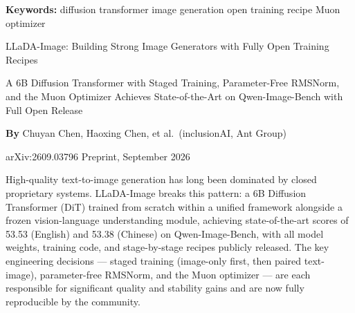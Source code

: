 \documentclass[10pt,twocolumn]{article}
\begin{document}
\setlength{\parindent}{0pt}
\setlength{\parskip}{4pt}

{\small\color{keywordgray}\textbf{Keywords:}
  diffusion transformer \textbullet{}
  image generation \textbullet{}
  open training recipe \textbullet{}
  Muon optimizer}\par\vspace{4pt}

{\LARGE\bfseries\raggedright
  LLaDA-Image: Building Strong Image Generators
  with Fully Open Training Recipes}\par\vspace{4pt}

{\large\itshape\raggedright
  A 6B Diffusion Transformer with Staged Training,
  Parameter-Free RMSNorm, and the Muon Optimizer
  Achieves State-of-the-Art on Qwen-Image-Bench
  with Full Open Release}\par\vspace{6pt}

{\small\textbf{By} Chuyan Chen, Haoxing Chen, et al.\
  (inclusionAI, Ant Group)}\par\vspace{2pt}

{\small\color{keywordgray}arXiv:2609.03796 \textbullet{} Preprint, September 2026}
\par\vspace{2pt}\noindent{\color{rulered}\rule{\columnwidth}{0.6pt}}\vspace{6pt}

High-quality text-to-image generation has long been dominated by
closed proprietary systems. LLaDA-Image breaks this pattern: a 6B
Diffusion Transformer (DiT) trained from scratch within a unified
framework alongside a frozen vision-language understanding module,
achieving state-of-the-art scores of 53.53 (English) and 53.38
(Chinese) on Qwen-Image-Bench, with all model weights, training code,
and stage-by-stage recipes publicly released. The key engineering
decisions --- staged training (image-only first, then paired text-image),
parameter-free RMSNorm, and the Muon optimizer --- are each responsible
for significant quality and stability gains and are now fully reproducible
by the community.
\end{document}
